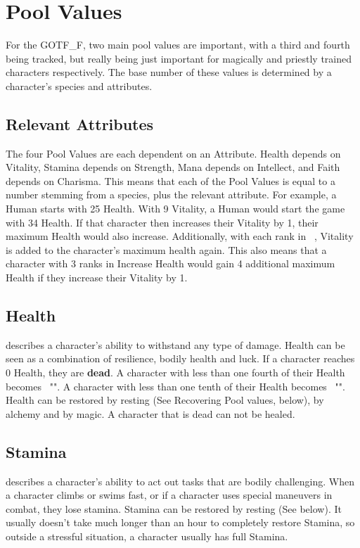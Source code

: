 \section{Pool Values}\label{sec:pools}
For the GOTF\_F, two main pool values are important, with a third and fourth being tracked, but really being just important for magically and priestly trained characters respectively.
The base number of these values is determined by a character's species and attributes.\\

\subsection{Relevant Attributes}\label{subsec:relevantAttributesPools}
The four Pool Values are each dependent on an Attribute.
Health depends on Vitality, Stamina depends on Strength, Mana depends on Intellect, and Faith depends on Charisma.
This means that each of the Pool Values is equal to a number stemming from a species, plus the relevant attribute.
For example, a Human starts with 25 Health.
With 9 Vitality, a Human would start the game with 34 Health.
If that character then increases their Vitality by 1, their maximum Health would also increase.
Additionally, with each rank in ~, Vitality is added to the character's maximum health again.
This also means that a character with 3 ranks in Increase Health would gain 4 additional maximum Health if they increase their Vitality by 1.

\subsection{Health}\label{pool:health} describes a character's ability to withstand any type of damage.
Health can be seen as a combination of resilience, bodily health and luck.
If a character reaches 0 Health, they are \textbf{dead}.
A character with less than one fourth of their Health becomes ~"".
A character with less than one tenth of their Health becomes ~"".
Health can be restored by resting (See Recovering Pool values, below), by alchemy and by magic.
A character that is dead can not be healed.

\subsection{Stamina}\label{pool:stamina} describes a character's ability to act out tasks that are bodily challenging.
When a character climbs or swims fast, or if a character uses special maneuvers in combat, they lose stamina.
Stamina can be restored by resting (See below).
It usually doesn't take much longer than an hour to completely restore Stamina, so outside a stressful situation, a character usually has full Stamina.

